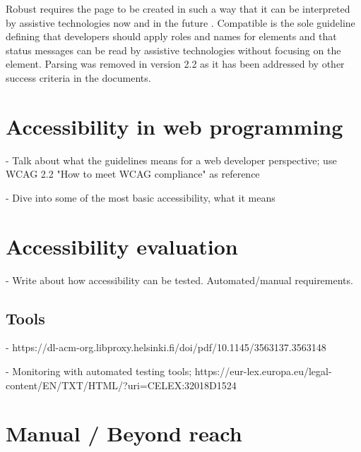 Robust requires the page to be created in such a way that it can be interpreted by assistive technologies now and in the future \citep{wcag22}. Compatible is the sole guideline defining that developers should apply roles and names for elements and that status messages can be read by assistive technologies without focusing on the element. Parsing was removed in version 2.2 as it has been addressed by other success criteria in the documents.


\section{Accessibility in web programming}

- Talk about what the guidelines means for a web developer perspective; use WCAG 2.2 "How to meet WCAG compliance" as reference

- Dive into some of the most basic accessibility, what it means

\section{Accessibility evaluation}

- Write about how accessibility can be tested. Automated/manual requirements.

\subsection{Tools}

- https://dl-acm-org.libproxy.helsinki.fi/doi/pdf/10.1145/3563137.3563148

- Monitoring with automated testing tools; https://eur-lex.europa.eu/legal-content/EN/TXT/HTML/?uri=CELEX:32018D1524

\section{Manual / Beyond reach}